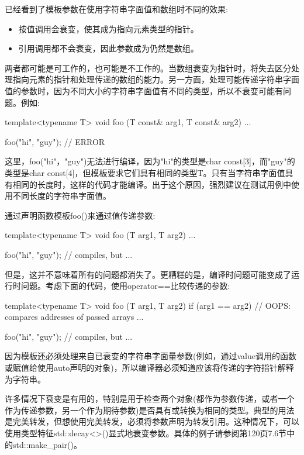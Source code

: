 
已经看到了模板参数在使用字符串字面值和数组时不同的效果:

\begin{itemize}
\item 
按值调用会衰变，使其成为指向元素类型的指针。

\item 
引用调用都不会衰变，因此参数成为仍然是数组。
\end{itemize}

两者都可能是可工作的，也可能是不工作的。当数组衰变为指针时，将失去区分处理指向元素的指针和处理传递的数组的能力。另一方面，处理可能传递字符串字面值的参数时，因为不同大小的字符串字面值有不同的类型，所以不衰变可能有问题。例如:

\begin{cpp}
template<typename T>
void foo (T const& arg1, T const& arg2)
{
	...
}

foo("hi", "guy"); // ERROR
\end{cpp}

这里，foo("hi"，"guy")无法进行编译，因为"hi"的类型是char const[3]，而"guy"的类型是char const[4]，但模板要求它们具有相同的类型T。只有当字符串字面值具有相同的长度时，这样的代码才能编译。出于这个原因，强烈建议在测试用例中使用不同长度的字符串字面值。

通过声明函数模板foo()来通过值传递参数:

\begin{cpp}
template<typename T>
void foo (T arg1, T arg2)
{
	...
}

foo("hi", "guy"); // compiles, but ...
\end{cpp}

但是，这并不意味着所有的问题都消失了。更糟糕的是，编译时问题可能变成了运行时问题。考虑下面的代码，使用operator==比较传递的参数:

\begin{cpp}
template<typename T>
void foo (T arg1, T arg2)
{
	if (arg1 == arg2) { // OOPS: compares addresses of passed arrays
		...
	}
}

foo("hi", "guy"); // compiles, but ...
\end{cpp}

因为模板还必须处理来自已衰变的字符串字面量参数(例如，通过value调用的函数或赋值给使用auto声明的对象)，所以编译器必须知道应该将传递的字符指针解释为字符串。

许多情况下衰变是有用的，特别是用于检查两个对象(都作为参数传递，或者一个作为传递参数，另一个作为期待参数)是否具有或转换为相同的类型。典型的用法是完美转发，但想使用完美转发，必须将参数声明为转发引用。这种情况下，可以使用类型特征std::decay<>()显式地衰变参数。具体的例子请参阅第120页7.6节中的std::make\_pair()。

